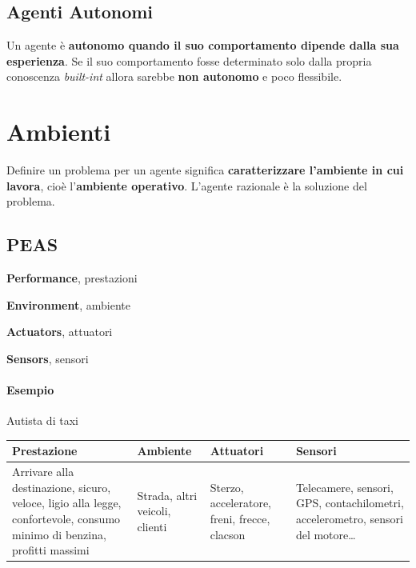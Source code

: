 \documentclass[10pt]{book}
\begin{document}
\subsection{Agenti Autonomi} Un agente è \textbf{autonomo quando il suo comportamento dipende dalla sua esperienza}. Se il suo comportamento fosse determinato solo dalla propria conoscenza \textit{built-int} allora sarebbe \textbf{non autonomo} e poco flessibile.
\pagebreak
\section{Ambienti}
Definire un problema per un agente significa \textbf{caratterizzare l'ambiente in cui lavora}, cioè l'\textbf{ambiente operativo}. L'agente razionale è la soluzione del problema.
\subsection{PEAS}
\begin{list}{}{}
	\item \textbf{Performance}, prestazioni
	\item \textbf{Environment}, ambiente
	\item \textbf{Actuators}, attuatori
	\item \textbf{Sensors}, sensori
\end{list}
\paragraph{Esempio} Autista di taxi
\begin{center}
	\begin{tabular}{p{4cm} | p{4cm} | p{4cm} | p{4cm}}
		\textbf{Prestazione} & \textbf{Ambiente} & \textbf{Attuatori} & \textbf{Sensori} \\
		\hline
		Arrivare alla destinazione, sicuro, veloce, ligio alla legge, confortevole, consumo minimo di benzina, profitti massimi & Strada, altri veicoli, clienti & Sterzo, acceleratore, freni, frecce, clacson & Telecamere, sensori, GPS, contachilometri, accelerometro, sensori del motore\ldots
	\end{tabular}
\end{center}
\end{document}
